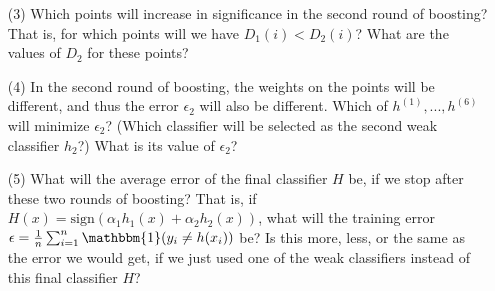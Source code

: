 \documentclass[10pt]{article}
\begin{document}
\begin{enumerate}[1.]
\begin{itemize}
\begin{enumerate}
			        \item[(3)] Which points will increase in significance in the second round of boosting? That is, for which points will we have $D_{1}(i) < D_{2}(i)$? What are the values of $D_{2}$ for these points?~\\

			        \item[(4)] In the second round of boosting, the weights on the points will be different, and thus the error $\epsilon_2$ will also be different. Which of $h^{(1)}, . . . , h^{(6)}$ will minimize $\epsilon_2$? (Which classifier will be selected as the second weak classifier $h_2$?) What is its value of $\epsilon_2$?~\\

			        \item[(5)] What will the average error of the final classifier $H$ be, if we stop after these two rounds of boosting? That is, if $H(x) = \text{sign}(\alpha_{1}h_{1}(x) + \alpha_{2}h_{2}(x))$, what will the  training error $\epsilon = \frac{1}{n} \sum_{i=1}^{n} \mathbbm{1} (y_{i} \neq h(x_{i}))$ be? Is this more, less, or the same as the error we would get, if we just used one of the weak classifiers instead of this final classifier $H$?~\\


\end{enumerate}
\end{itemize}
\end{enumerate}
\end{document}
